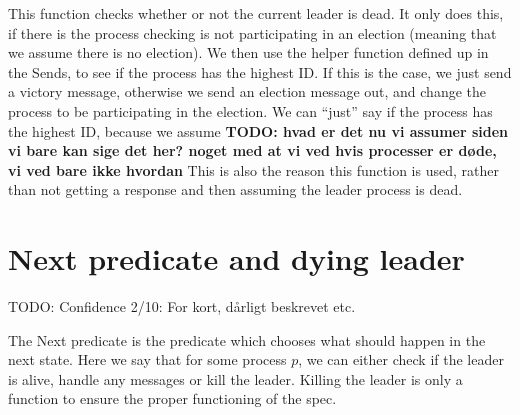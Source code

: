 \documentclass{report}
\begin{document}
This function checks whether or not the current leader is dead. It only does this, if there is the process checking is not participating in an election (meaning that we assume there is no election). We then use the helper function defined up in the Sends, to see if the process has the highest ID. If this is the case, we just send a victory message, otherwise we send an election message out, and change the process to be participating in the election.
We can ``just'' say if the process has the highest ID, because we assume \textbf{TODO: hvad er det nu vi assumer siden vi bare kan sige det her? noget med at vi ved hvis processer er døde, vi ved bare ikke hvordan}
This is also the reason this function is used, rather than not getting a response and then assuming the leader process is dead.

\section{Next predicate and dying leader}
\begin{callout}
TODO: Confidence 2/10: For kort, dårligt beskrevet etc.
\end{callout}

\noindent{}


The Next predicate is the predicate which chooses what should happen in the next state. Here we say that for some process $p$, we can either check if the leader is alive, handle any messages or kill the leader. Killing the leader is only a function to ensure the proper functioning of the spec.



\noindent{}
\end{document}
